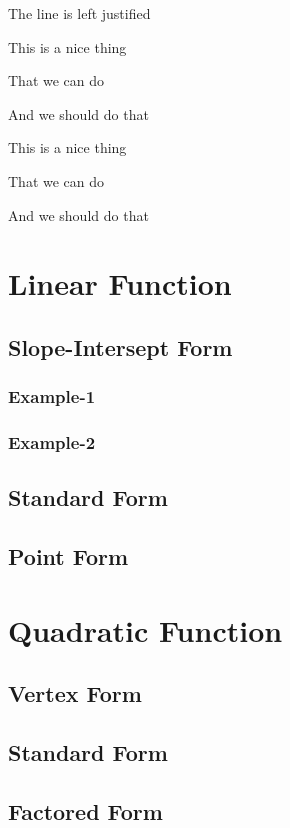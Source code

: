 \documentclass[11pt]{article}
\begin{document}
\begin{flushleft}
The line is left justified
\end{flushleft}

\Large
This is a nice thing 

That we can do 

And we should do that

\vspace{1cm}

\tiny
This is a nice thing 

That we can do 

And we should do that


\section{Linear Function}
	\subsection{Slope-Intersept Form}
		\subsubsection{Example-1}
		\subsubsection{Example-2}
	\subsection{Standard Form}
	\subsection{Point Form}

\section{Quadratic Function}
	\subsection{Vertex Form}
	\subsection{Standard Form}
	\subsection{Factored Form}
	
\end{document}

